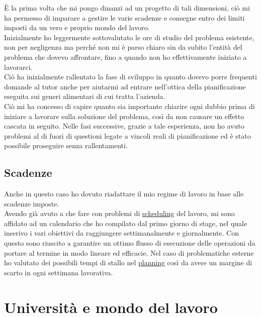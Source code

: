 È la prima volta che mi pongo dinanzi ad un progetto di tali dimensioni, ciò mi ha permesso di imparare a gestire le varie scadenze e consegne entro dei limiti
imposti da un vero e proprio mondo del lavoro. \\Inizialmente ho leggermente sottovalutato le ore di studio del problema esistente, non per negligenza ma perché non mi è parso
chiaro sin da subito l'entità del problema che dovevo affrontare, fino a quando non ho effettivamente iniziato a lavorarci.\\ Ciò ha inizialmente rallentato la fase di sviluppo
in quanto dovevo porre frequenti domande al tutor anche per aiutarmi ad entrare nell'ottica della pianificazione eseguita sui generi alimentari di cui tratta l'azienda.\\ Ciò mi
ha concesso di capire quanto sia importante chiarire ogni dubbio prima di iniziare a lavorare sulla soluzione del problema, così da non causare un effetto cascata in seguito.
Nelle fasi successive, grazie a tale esperienza, non ho avuto problemi al di fuori di questioni legate a vincoli reali di pianificazione ed è stato possibile proseguire senza
rallentamenti.

\subsection{Scadenze}

Anche in questo caso ho dovuto riadattare il mio regime di lavoro in base alle scadenze imposte.\\ Avendo già avuto a che fare con problemi di \hyperref[Scheduling]{scheduling\glo} del lavoro,
mi sono affidato ad un calendario che ho compilato dal primo giorno di stage, nel quale inserivo i vari obiettivi da raggiungere settimanalmente e giornalmente. Con questo
sono riuscito a garantire un ottimo flusso di esecuzione delle operazioni da portare al termine in modo lineare ed efficacie. Nel caso di problematiche esterne ho valutato dei
possibili tempi di stallo nel \hyperref[Planning]{planning\glo} così da avere un margine di scarto in ogni settimana lavorativa.

\section{Università e mondo del lavoro}

